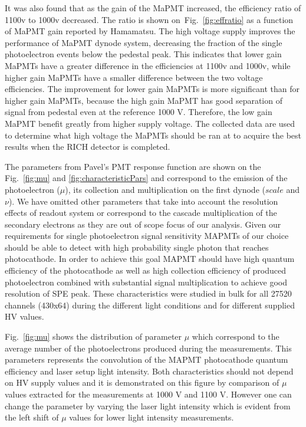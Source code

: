It was also found that as the gain of the MaPMT increased, the efficiency ratio of 1100v to 1000v decreased.
The ratio is shown on~Fig.~\ref{fig:effratio} as a function of MaPMT gain reported by Hamamatsu.
The high voltage supply improves the performance of MaPMT dynode system, decreasing the fraction of the single photoelectron events below the pedestal peak.
This indicates that lower gain MaPMTs have a greater difference in the efficiencies at 1100v and 1000v, while higher gain MaPMTs have a smaller difference between the two voltage efficiencies.
The improvement for lower gain MaPMTs is more significant than for higher gain MaPMTs, because the high gain MaPMT has good separation of signal from pedestal even at the reference 1000 V.
Therefore, the low gain MaPMT benefit greatly from higher supply voltage.
The collected data are used to determine what high voltage the MaPMTs should be ran at to acquire the best results when the RICH detector is completed.


The parameters from Pavel's PMT response function are shown on the Fig.~\ref{fig:mu} and \ref{fig:characteristicPars} and correspond to the emission of the photoelectron ($\mu$), its collection and multiplication on the first dynode ($scale$ and $\nu$).
We have omitted other parameters that take into account the resolution effects of readout system or correspond to the cascade multiplication of the secondary electrons as they are out of scope focus of our analysis.
Given our requirements for single photoelectron signal sensitivity MAPMTs of our choice should be able to detect with high probability single photon that reaches photocathode.
In order to achieve this goal MAPMT should have high quantum efficiency of the photocathode as well as high collection efficiency of produced photoelectron combined with substantial signal multiplication to achieve good resolution of SPE peak.
These characteristics were studied in bulk for all 27520 channels (430x64) during the different light conditions and for different supplied HV values.


Fig.~\ref{fig:mu} shows the distribution of parameter $\mu$ which correspond to the average number of the photoelectrons produced during the measurements.
This parameters represents the convolution of the MAPMT photocathode quantum efficiency and laser setup light intensity.
Both characteristics should not depend on HV supply values and it is demonstrated on this figure by comparison of $\mu$ values extracted for the measurements at 1000 V and 1100 V.
However one can change the parameter by varying the laser light intensity which is evident from the left shift of $\mu$ values for lower light intensity measurements.

